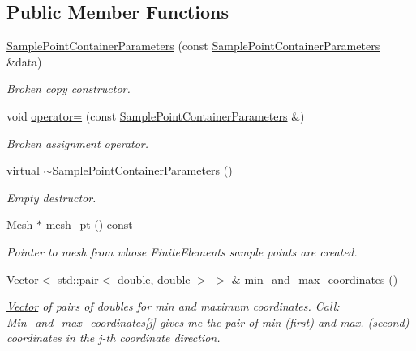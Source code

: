 \subsection*{Public Member Functions}
\begin{DoxyCompactItemize}
\item 
\hyperlink{classoomph_1_1SamplePointContainerParameters_a63f93ee4ddc61cb01af363187de21947}{Sample\+Point\+Container\+Parameters} (const \hyperlink{classoomph_1_1SamplePointContainerParameters}{Sample\+Point\+Container\+Parameters} \&data)
\begin{DoxyCompactList}\small\item\em Broken copy constructor. \end{DoxyCompactList}\item 
void \hyperlink{classoomph_1_1SamplePointContainerParameters_aa089aeff405b3e4362b4335a9acfb5a2}{operator=} (const \hyperlink{classoomph_1_1SamplePointContainerParameters}{Sample\+Point\+Container\+Parameters} \&)
\begin{DoxyCompactList}\small\item\em Broken assignment operator. \end{DoxyCompactList}\item 
virtual \hyperlink{classoomph_1_1SamplePointContainerParameters_a5e0ced492320cc06615bcb1782b7bb22}{$\sim$\+Sample\+Point\+Container\+Parameters} ()
\begin{DoxyCompactList}\small\item\em Empty destructor. \end{DoxyCompactList}\item 
\hyperlink{classoomph_1_1Mesh}{Mesh} $\ast$ \hyperlink{classoomph_1_1SamplePointContainerParameters_a92bcab955d47e99d47b601253da7b6b2}{mesh\+\_\+pt} () const
\begin{DoxyCompactList}\small\item\em Pointer to mesh from whose Finite\+Elements sample points are created. \end{DoxyCompactList}\item 
\hyperlink{classoomph_1_1Vector}{Vector}$<$ std\+::pair$<$ double, double $>$ $>$ \& \hyperlink{classoomph_1_1SamplePointContainerParameters_ae5b9cd742d38c42d337ede45bb9dda8c}{min\+\_\+and\+\_\+max\+\_\+coordinates} ()
\begin{DoxyCompactList}\small\item\em \hyperlink{classoomph_1_1Vector}{Vector} of pairs of doubles for min and maximum coordinates. Call\+: Min\+\_\+and\+\_\+max\+\_\+coordinates\mbox{[}j\mbox{]} gives me the pair of min (first) and max. (second) coordinates in the j-\/th coordinate direction. \end{DoxyCompactList}\item 

\end{DoxyCompactItemize}
